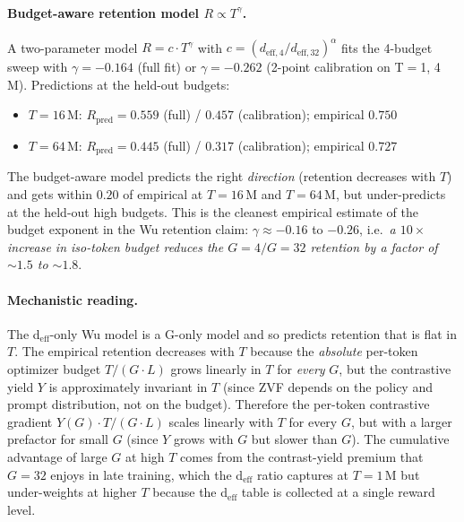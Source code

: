 \paragraph{Budget-aware retention model $R \propto T^\gamma$.}
A two-parameter model $R = c \cdot T^\gamma$ with $c =
(d_{\mathrm{eff},4}/d_{\mathrm{eff},32})^\alpha$ fits the
4-budget sweep with $\gamma = -0.164$ (full fit) or
$\gamma = -0.262$ (2-point calibration on T$=${1, 4}\,M).
Predictions at the held-out budgets:
\begin{itemize}
  \item $T{=}16$\,M: $R_{\mathrm{pred}} = 0.559$ (full) / $0.457$ (calibration); empirical $0.750$
  \item $T{=}64$\,M: $R_{\mathrm{pred}} = 0.445$ (full) / $0.317$ (calibration); empirical $0.727$
\end{itemize}
The budget-aware model predicts the right \emph{direction}
(retention decreases with $T$) and gets within $0.20$ of empirical
at $T{=}16$\,M and $T{=}64$\,M, but under-predicts at the held-out
high budgets.  This is the cleanest empirical estimate of the
budget exponent in the Wu retention claim: $\gamma \approx -0.16$
to $-0.26$, i.e.\ \emph{a $10\times$ increase in iso-token budget
reduces the $G{=}4/G{=}32$ retention by a factor of $\sim 1.5$ to
$\sim 1.8$}.

\paragraph{Mechanistic reading.}
The d$_{\mathrm{eff}}$-only Wu model is a G-only model and so
predicts retention that is flat in $T$.  The empirical retention
decreases with $T$ because the \emph{absolute} per-token optimizer
budget $T / (G \cdot L)$ grows linearly in $T$ for \emph{every} $G$,
but the contrastive yield $Y$ is approximately invariant in $T$
(since ZVF depends on the policy and prompt distribution, not on
the budget).  Therefore the per-token contrastive gradient
$Y(G) \cdot T / (G \cdot L)$ scales linearly with $T$ for every $G$,
but with a larger prefactor for small $G$ (since $Y$ grows with $G$
but slower than $G$).  The cumulative advantage of large $G$ at
high $T$ comes from the contrast-yield premium that $G{=}32$ enjoys
in late training, which the d$_{\mathrm{eff}}$ ratio captures at
$T{=}1$\,M but under-weights at higher $T$ because the d$_{\mathrm{eff}}$
table is collected at a single reward level.

